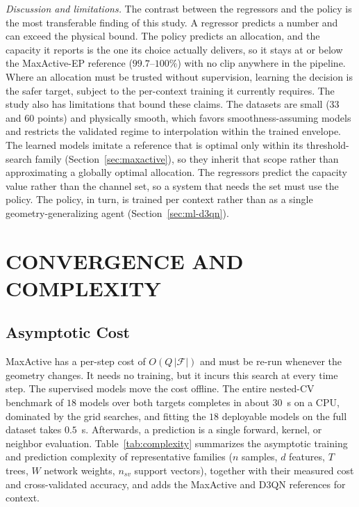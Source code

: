 \documentclass[correspondence]{IEEEtaes}
\begin{document}
\emph{Discussion and limitations.} The contrast between the regressors and the policy is
the most transferable finding of this study. A regressor predicts a number and can exceed
the physical bound. The policy predicts an allocation, and the capacity it reports is the
one its choice actually delivers, so it stays at or below the MaxActive-EP reference
($99.7$--$100\%$) with no clip anywhere in the pipeline. Where an allocation must be
trusted without supervision, learning the decision is the safer target, subject to the
per-context training it currently requires. The study also has limitations that bound
these claims. The datasets are small ($33$ and $60$ points) and physically smooth, which
favors smoothness-assuming models and restricts the validated regime to interpolation
within the trained envelope. The learned models imitate a reference that is optimal only
within its threshold-search family (Section~\ref{sec:maxactive}), so they inherit that
scope rather than approximating a globally optimal allocation. The regressors predict the
capacity value rather than the channel set, so a system that needs the set must use the
policy. The policy, in turn, is trained per context rather than as a single
geometry-generalizing agent (Section~\ref{sec:ml-d3qn}).


\section{CONVERGENCE AND COMPLEXITY}
\label{sec:complexity}
\subsection{Asymptotic Cost}
MaxActive has a per-step cost of $O(Q\,|\mathcal{F}|)$ and must be re-run whenever the
geometry changes. It needs no training, but it incurs this search at every time step. The
supervised models move the cost offline. The entire nested-CV benchmark of $18$ models
over both targets completes in about $30$~s on a CPU, dominated by the grid searches, and
fitting the $18$ deployable models on the full dataset takes $0.5$~s. Afterwards, a
prediction is a single forward, kernel, or neighbor evaluation. Table~\ref{tab:complexity}
summarizes the asymptotic training and prediction complexity of representative families
($n$ samples, $d$ features, $T$ trees, $W$ network weights, $n_{sv}$ support vectors),
together with their measured cost and cross-validated accuracy, and adds the MaxActive and
D3QN references for context.
\end{document}
